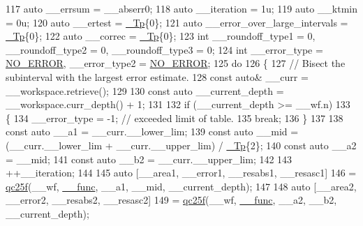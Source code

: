 \begin{DoxyCode}
117       \textcolor{keyword}{auto} \_\_errsum = \_\_abserr0;
118       \textcolor{keyword}{auto} \_\_iteration = 1u;
119       \textcolor{keyword}{auto} \_\_ktmin = 0u;
120       \textcolor{keyword}{auto} \_\_ertest = \hyperlink{namespace____gnu__cxx_a3b19a9c800ca194374ef9172290f7d79}{\_Tp}\{0\};
121       \textcolor{keyword}{auto} \_\_error\_over\_large\_intervals = \hyperlink{namespace____gnu__cxx_a3b19a9c800ca194374ef9172290f7d79}{\_Tp}\{0\};
122       \textcolor{keyword}{auto} \_\_correc = \hyperlink{namespace____gnu__cxx_a3b19a9c800ca194374ef9172290f7d79}{\_Tp}\{0\};
123       \textcolor{keywordtype}{int} \_\_roundoff\_type1 = 0, \_\_roundoff\_type2 = 0, \_\_roundoff\_type3 = 0;
124       \textcolor{keywordtype}{int} \_\_error\_type = \hyperlink{namespace____gnu__cxx_ad6c62dd86a596716cece6ac2d4cfd4b3ac31eecc280b10dec2efb4a2216ccc2e0}{NO\_ERROR}, \_\_error\_type2 = \hyperlink{namespace____gnu__cxx_ad6c62dd86a596716cece6ac2d4cfd4b3ac31eecc280b10dec2efb4a2216ccc2e0}{NO\_ERROR};
125       \textcolor{keywordflow}{do}
126         \{
127           \textcolor{comment}{// Bisect the subinterval with the largest error estimate.}
128           \textcolor{keyword}{const} \textcolor{keyword}{auto}& \_\_curr = \_\_workspace.retrieve();
129 
130           \textcolor{keyword}{const} \textcolor{keyword}{auto} \_\_current\_depth = \_\_workspace.curr\_depth() + 1;
131 
132           \textcolor{keywordflow}{if} (\_\_current\_depth >= \_\_wf.n)
133             \{
134               \_\_error\_type = -1; \textcolor{comment}{// exceeded limit of table.}
135               \textcolor{keywordflow}{break};
136             \}
137 
138           \textcolor{keyword}{const} \textcolor{keyword}{auto} \_\_a1 = \_\_curr.\_\_lower\_lim;
139           \textcolor{keyword}{const} \textcolor{keyword}{auto} \_\_mid = (\_\_curr.\_\_lower\_lim + \_\_curr.\_\_upper\_lim) / \hyperlink{namespace____gnu__cxx_a3b19a9c800ca194374ef9172290f7d79}{\_Tp}\{2\};
140           \textcolor{keyword}{const} \textcolor{keyword}{auto} \_\_a2 = \_\_mid;
141           \textcolor{keyword}{const} \textcolor{keyword}{auto} \_\_b2 = \_\_curr.\_\_upper\_lim;
142 
143           ++\_\_iteration;
144 
145           \textcolor{keyword}{auto} [\_\_area1, \_\_error1, \_\_resabs1, \_\_resasc1]
146             = \hyperlink{namespace____gnu__cxx_a1362a6c4ef82cf1afe4de6bc66fb56b6}{qc25f}(\_\_wf, \hyperlink{namespace____gnu__cxx_af2b2f0c7a2ae72b922b1afefae5a65b2}{\_\_func}, \_\_a1, \_\_mid, \_\_current\_depth);
147 
148           \textcolor{keyword}{auto} [\_\_area2, \_\_error2, \_\_resabs2, \_\_resasc2]
149             = \hyperlink{namespace____gnu__cxx_a1362a6c4ef82cf1afe4de6bc66fb56b6}{qc25f}(\_\_wf, \hyperlink{namespace____gnu__cxx_af2b2f0c7a2ae72b922b1afefae5a65b2}{\_\_func}, \_\_a2, \_\_b2, \_\_current\_depth);

\end{DoxyCode}
